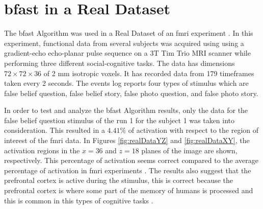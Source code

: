 \chapter{\texorpdfstring{\gls{bfast}}{BFAST} in a Real Dataset}

The \gls{bfast} Algorithm was used in a Real Dataset of an \gls{fmri} experiment \cite{moran2012social}. 
In this experiment, functional data from several subjects was acquired using using a
gradient-echo echo-planar pulse sequence on a 3T Tim Trio MRI scanner while performing three different 
social-cognitive tasks. The data has dimensions $72\times72\times36$ of 2 mm isotropic voxels. It has 
recorded data from 179 timeframes taken every 2 seconds. The events log reports four types of stimulus 
which are false belief question, false belief story, false photo question, and false photo story.

In order to test and analyze the \gls{bfast} Algorithm results, only 
the data for the false belief question stimulus of the run 1 for the subject 1 was taken into 
consideration. This resulted in a $4.41\%$ of activation with respect to the region of interest 
of the \gls{fmri} data. In Figures \ref{fig:realDataYZ} and \ref{fig:realDataXY}, 
the activation regions in the $x=36$ and $z=18$ planes of the image are shown, respectively. 
This percentage of activation seems correct compared to the average percentage of activation in
\gls{fmri} experiments \cite{lazar2008statistical}. The results also suggest that the prefrontal 
cortex is active during the stimulus, this is correct because the prefrontal cortex is where some
part of the memory of humans is processed and this is common in this types of cognitive 
tasks \cite{amin2012brain}. 


